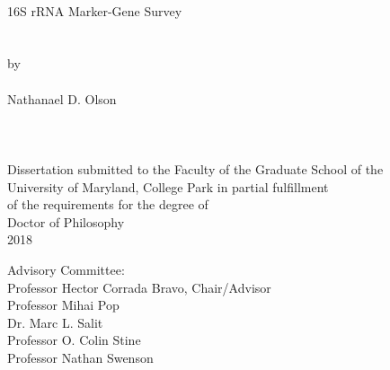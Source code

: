
\thispagestyle{empty}
\hbox{\ }
\vspace{1in}
\renewcommand{\baselinestretch}{1}
\small\normalsize
\begin{center}

\large{{16S rRNA Marker-Gene Survey}}\\
\ \\
\ \\
\large{by} \\
\ \\
\large{Nathanael D. Olson}%
\ \\
\ \\
\ \\
\ \\
\normalsize
Dissertation submitted to the Faculty of the Graduate School of the \\
University of Maryland, College Park in partial fulfillment \\
of the requirements for the degree of \\
Doctor of Philosophy \\
2018
\end{center}

\vspace{7.5em}

\noindent Advisory Committee: \\
Professor Hector Corrada Bravo, Chair/Advisor \\
Professor Mihai Pop \\
Dr. Marc L. Salit \\
Professor O. Colin Stine \\
Professor Nathan Swenson
